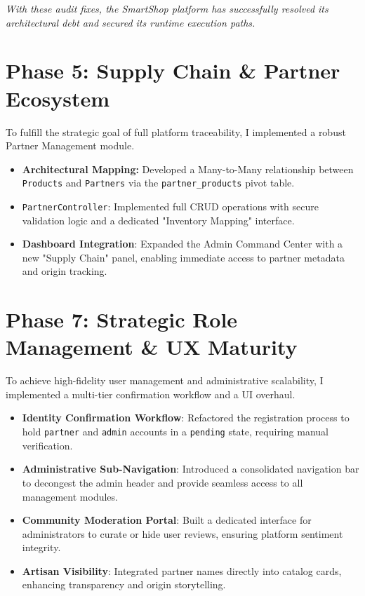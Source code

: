 \documentclass[12pt,a4paper]{article}
\begin{document}
\vfill
\begin{center}
    \textit{With these audit fixes, the SmartShop platform has successfully resolved its architectural debt and secured its runtime execution paths.}
\end{center}

\section{Phase 5: Supply Chain \& Partner Ecosystem}
To fulfill the strategic goal of full platform traceability, I implemented a robust Partner Management module.
\begin{itemize}
    \item \textbf{Architectural Mapping:} Developed a Many-to-Many relationship between \texttt{Products} and \texttt{Partners} via the \texttt{partner\_products} pivot table.
    \item \texttt{PartnerController}: Implemented full CRUD operations with secure validation logic and a dedicated "Inventory Mapping" interface.
    \item \textbf{Dashboard Integration}: Expanded the Admin Command Center with a new "Supply Chain" panel, enabling immediate access to partner metadata and origin tracking.
\end{itemize}

\section{Phase 7: Strategic Role Management \& UX Maturity}
To achieve high-fidelity user management and administrative scalability, I implemented a multi-tier confirmation workflow and a UI overhaul.
\begin{itemize}
    \item \textbf{Identity Confirmation Workflow}: Refactored the registration process to hold \texttt{partner} and \texttt{admin} accounts in a \texttt{pending} state, requiring manual verification.
    \item \textbf{Administrative Sub-Navigation}: Introduced a consolidated navigation bar to decongest the admin header and provide seamless access to all management modules.
    \item \textbf{Community Moderation Portal}: Built a dedicated interface for administrators to curate or hide user reviews, ensuring platform sentiment integrity.
    \item \textbf{Artisan Visibility}: Integrated partner names directly into catalog cards, enhancing transparency and origin storytelling.
\end{itemize}
\end{document}
